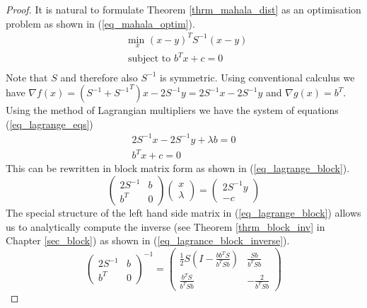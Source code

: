 \begin{proof}
It is natural to formulate Theorem \ref{thrm_mahala_dist} as an optimisation problem as shown in (\ref{eq_mahala_optim}). \begin{equation}
\begin{aligned}
&\underset{x}{\text{min }} (x-y)^TS^{-1}(x-y)\\
& \text{subject to } b^Tx+c = 0\\
\end{aligned}
\label{eq_mahala_optim}
\end{equation}
Note that $S$ and therefore also $S^{-1}$ is symmetric. Using conventional calculus we have $\nabla f(x) = (S^{-1} + {S^{-1}}^T)x - 2S^{-1}y = 2S^{-1}x - 2S^{-1}y$ and $\nabla g(x) = b^T$. Using the method of Lagrangian multipliers \cite{forst} we have the system of equations (\ref{eq_lagrange_eqs})
\begin{equation}
\begin{aligned}
2S^{-1}x - 2S^{-1}y + \lambda b = 0 \\
b^Tx+c = 0
\end{aligned}
\label{eq_lagrange_eqs}
\end{equation}
This can be rewritten in block matrix form as shown in (\ref{eq_lagrange_block}).
\begin{equation}
\begin{pmatrix}
2S^{-1} & b \\ b^T & 0
\end{pmatrix} \begin{pmatrix}
x \\ \lambda
\end{pmatrix} = \begin{pmatrix}
2S^{-1}y \\ -c
\end{pmatrix}
\label{eq_lagrange_block}
\end{equation}
The special structure of the left hand side matrix in (\ref{eq_lagrange_block}) allows us to analytically compute the inverse (see Theorem \ref{thrm_block_inv} in Chapter \ref{sec_block}) as shown in (\ref{eq_lagrance_block_inverse}).
\begin{equation}
\begin{pmatrix}
2S^{-1} & b \\ b^T & 0
\end{pmatrix}^{-1} = \begin{pmatrix}
\frac{1}{2}S(I-\frac{bb^TS}{b^TSb}) & \frac{Sb}{b^TSb} \\ \frac{b^TS}{b^TSb} & -\frac{2}{b^TSb}

\end{pmatrix}
\end{equation}
\end{proof}
